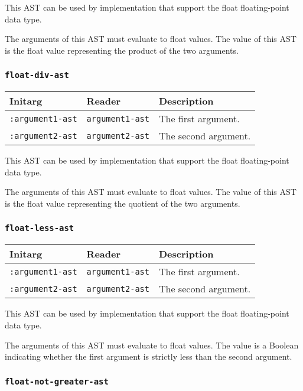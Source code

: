 This AST can be used by implementation that support the float
floating-point data type.

The arguments of this AST must evaluate to float
values.  The value of this AST is the float value
representing the product of the two arguments.

\subsubsection{\texttt{float-div-ast}}
\label{sec-ast-float-div}

\begin{tabular}{|l|l|l|}
\hline
Initarg & Reader & Description\\
\hline\hline
\texttt{:argument1-ast} & \texttt{argument1-ast} & The first argument.\\
\hline
\texttt{:argument2-ast} & \texttt{argument2-ast} & The second argument.\\
\hline
\end{tabular}

This AST can be used by implementation that support the float
floating-point data type.

The arguments of this AST must evaluate to float
values.  The value of this AST is the float value
representing the quotient of the two arguments.

\subsubsection{\texttt{float-less-ast}}
\label{sec-ast-float-less}

\begin{tabular}{|l|l|l|}
\hline
Initarg & Reader & Description\\
\hline\hline
\texttt{:argument1-ast} & \texttt{argument1-ast} & The first argument.\\
\hline
\texttt{:argument2-ast} & \texttt{argument2-ast} & The second argument.\\
\hline
\end{tabular}

This AST can be used by implementation that support the float
floating-point data type.

The arguments of this AST must evaluate to float
values.  The value is a Boolean indicating whether the first argument
is strictly less than the second argument.

\subsubsection{\texttt{float-not-greater-ast}}
\label{sec-ast-float-not-greater}

